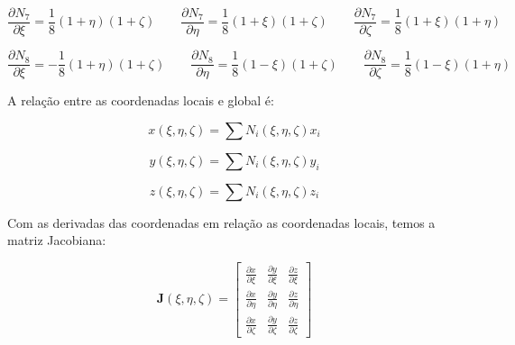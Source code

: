         \begin{equation*}
            \frac{\partial N_7}{\partial \xi} =  \frac{1}{8}\left(1+\eta\right)\left(1+\zeta\right)  \quad \quad 
            \frac{\partial N_7}{\partial \eta} =  \frac{1}{8}\left(1+\xi\right)\left(1+\zeta\right)  \quad \quad 
            \frac{\partial N_7}{\partial \zeta} =  \frac{1}{8}\left(1+\xi\right)\left(1+\eta\right)
        \end{equation*}

        \begin{equation}
            \frac{\partial N_8}{\partial \xi} = -\frac{1}{8}\left(1+\eta\right)\left(1+\zeta\right)  \quad \quad 
            \frac{\partial N_8}{\partial \eta} =  \frac{1}{8}\left(1-\xi\right)\left(1+\zeta\right)  \quad \quad 
            \frac{\partial N_8}{\partial \zeta} =  \frac{1}{8}\left(1-\xi\right)\left(1+\eta\right)
        \end{equation}

        A relação entre as coordenadas locais e global é:

        \begin{equation*}
            x(\xi, \eta, \zeta) = \sum N_i(\xi,\eta, \zeta) x_i
        \end{equation*}

        \begin{equation*}
            y(\xi, \eta, \zeta) = \sum N_i(\xi,\eta,\zeta) y_i
        \end{equation*}

        \begin{equation}
            z(\xi, \eta, \zeta) = \sum N_i(\xi,\eta,\zeta) z_i
        \end{equation}


        Com as derivadas das coordenadas em relação as coordenadas locais, temos a matriz Jacobiana:

        \begin{equation}
            \mathbf{J}(\xi, \eta, \zeta) = 
            \begin{bmatrix}
                \frac{\partial x}{\partial \xi} &  \frac{\partial y}{\partial \xi} &  \frac{\partial z}{\partial \xi}\\
                \frac{\partial x}{\partial \eta} &  \frac{\partial y}{\partial \eta} &  \frac{\partial z}{\partial \eta}\\
                \frac{\partial x}{\partial \zeta} &  \frac{\partial y}{\partial \zeta} &  \frac{\partial z}{\partial \zeta}
            \end{bmatrix}
        \end{equation}

